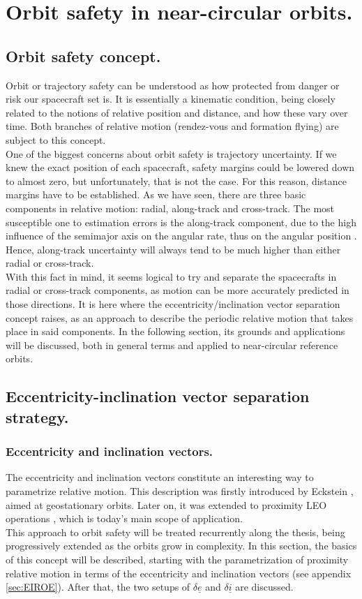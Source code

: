 \section{Orbit safety in near-circular orbits.}
%
%
	\subsection{Orbit safety concept.}
	\indent Orbit or trajectory safety can be understood as how protected from danger or risk our spacecraft set is. It is essentially a kinematic condition, being closely related to the notions of relative position and distance, and how these vary over time. Both branches of relative motion (\ie rendez-vous and formation flying) are subject to this concept. \\
	\indent One of the biggest concerns about orbit safety is trajectory uncertainty. If we knew the exact position of each spacecraft, safety margins could be lowered down to almost zero, but unfortunately, that is not the case. For this reason, distance margins have to be established. As we have seen, there are three basic components in relative motion: radial, along-track and cross-track. The most susceptible one to estimation errors is the along-track component, due to the high influence of the semimajor axis on the angular rate, thus on the angular position \cite{Eckstein}. Hence, along-track uncertainty will always tend to be much higher than either radial or cross-track.\\
	\indent With this fact in mind, it seems logical to try and separate the spacecrafts in radial or cross-track components, as motion can be more accurately predicted in those directions. It is here where the eccentricity/inclination vector separation concept raises, as an approach to describe the periodic relative motion that takes place in said components. In the following section, its grounds and applications will be discussed, both in general terms and applied to near-circular reference orbits.
	\subsection{Eccentricity-inclination vector separation strategy.}
		\subsubsection{Eccentricity and inclination vectors.}
		\indent The eccentricity and inclination vectors constitute an interesting way to parametrize relative motion. This description was firstly introduced by Eckstein \cite{Eckstein}, aimed at geostationary orbits. Later on, it was extended to proximity LEO operations \cite{Montenbruck_DAmico}, which is today's main scope of application. \\
		\indent This approach to orbit safety will be treated recurrently along the thesis, being progressively extended as the orbits grow in complexity. In this section, the basics of this concept will be described, starting with the parametrization of proximity relative motion in terms of the eccentricity and inclination vectors (see appendix \ref{sec:EIROE}). After that, the two setups of $\delta \underline{e}$ and $\delta \underline{i}$ are discussed.
